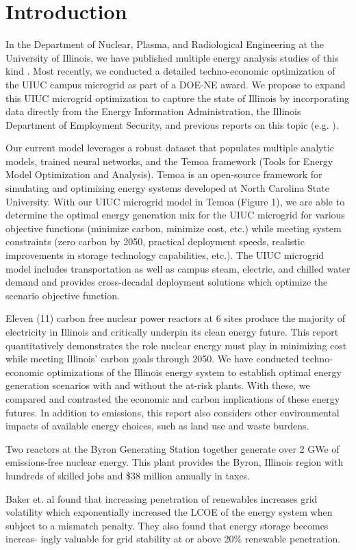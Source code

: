\section{Introduction}
In the Department of Nuclear, Plasma, and Radiological Engineering at the 
University of Illinois, we have published multiple energy analysis studies of 
this kind \cite{stuff}. Most recently, we conducted a detailed techno-economic 
optimization of the UIUC campus microgrid as part of a DOE-NE award. We propose 
to expand this UIUC microgrid optimization to capture the state of Illinois by 
incorporating data directly from the Energy Information Administration, the 
Illinois Department of Employment Security, and previous reports on this topic 
(e.g. \cite{stuff}).

Our current model leverages a robust dataset that populates multiple analytic 
models, trained neural networks, and  the Temoa framework (Tools for Energy 
Model Optimization and Analysis)\cite{temoa}. Temoa is an open-source framework for 
simulating and optimizing energy systems developed at North Carolina State 
University. With our \gls{UIUC} microgrid model in 
Temoa (Figure 1), we are able to determine the optimal energy generation mix 
for the \gls{UIUC} microgrid for various objective functions (minimize carbon, 
minimize cost, etc.) while meeting system constraints (zero carbon by 2050, 
practical deployment speeds, realistic improvements in storage technology 
capabilities, etc.). The UIUC microgrid model includes transportation as well 
as campus steam, electric, and chilled water demand and provides cross-decadal 
deployment solutions which optimize the scenario objective function.



Eleven (11) carbon free nuclear power reactors at 6 sites produce the majority of
electricity in Illinois and critically underpin its clean energy future. This
report quantitatively demonstrates the role nuclear energy must play in
minimizing cost while meeting Illinois’ carbon goals
through 2050. We have conducted techno-economic optimizations of
the Illinois energy system to establish optimal energy generation scenarios with and without the
at-risk plants. With these, we compared and contrasted the economic and carbon implications of
these energy futures. In addition to emissions, this report also considers
other environmental impacts of available energy choices, such as land use and
waste burdens.

Two reactors at the Byron Generating Station together generate over 2 GWe of
emissions-free nuclear energy. This plant provides the Byron, Illinois region
with hundreds of skilled jobs and \$38 million annually in taxes.


Baker et. al found that increasing penetration of renewables increases grid 
volatility which exponentially increased the \gls{LCOE} of the energy system when 
subject to a mismatch penalty. They also found that energy storage becomes 
increas- ingly valuable for grid stability at or above 20\% renewable 
penetration.


